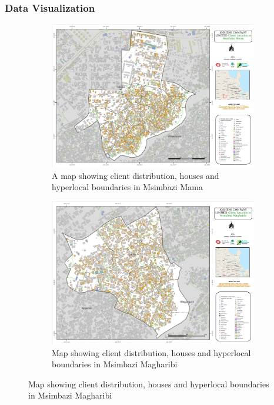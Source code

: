 \documentclass[a4paper,12pt,twoside]{article}
\begin{document}
\subsubsection{Data Visualization}
\begin{figure}
  \begin{subfigure}[b]{0.5\textwidth}
   \includegraphics[width=\textwidth]{images/Msimbazi_mama.png}
   \color{RHgreen}\caption{A map showing client distribution, houses and hyperlocal boundaries in Msimbazi Mama}
    \label{fig:1}
  \end{subfigure}
  \begin{subfigure}[b]{0.5\textwidth}
   \includegraphics[width=\textwidth]{images/Msimbazi_magharibi.png}
    \color{RHgreen}\caption{Map showing client distribution, houses and hyperlocal boundaries in Msimbazi Magharibi}
    \label{fig:2}
  \end{subfigure}
\end{figure}
\end{document}
